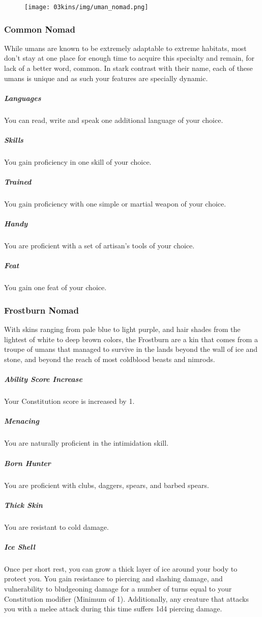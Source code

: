 \begin{linenumbers}
\begin{figure}[!t]
    \centering
    \texttt{[image: 03kins/img/uman\_nomad.png]}
\end{figure}

\subsubsection{Common Nomad}
While umans are known to be extremely adaptable to extreme habitats, most don't stay at one place for enough time to acquire this specialty and remain, for lack of a better word, common.
In stark contrast with their name, each of these umans is unique and as such your features are specially dynamic.
\subparagraph{Languages} You can read, write and speak one additional language of your choice.
\subparagraph{Skills} You gain proficiency in one skill of your choice.
\subparagraph{Trained} You gain proficiency with one simple or martial weapon of your choice.
\subparagraph{Handy} You are proficient with a set of artisan's tools of your choice.
\subparagraph{Feat} You gain one feat of your choice.

\subsubsection{Frostburn Nomad}
With skins ranging from pale blue to light purple, and hair shades from the lightest of white to deep brown colors, the Frostburn are a kin that comes from a troupe of umans that managed to survive in the lands beyond the wall of ice and stone, and beyond the reach of most coldblood beasts and nimrods.
\subparagraph{Ability Score Increase} Your Constitution score is increased by 1.
\subparagraph{Menacing} You are naturally proficient in the intimidation skill.
\subparagraph{Born Hunter} You are proficient with clubs, daggers, spears, and barbed spears.
\subparagraph{Thick Skin} %
You are resistant to cold damage.%
\subparagraph{Ice Shell} Once per short rest, you can grow a thick layer of ice around your body to protect you.
You gain resistance to piercing and slashing damage, and vulnerability to bludgeoning damage for a number of turns equal to your Constitution modifier (Minimum of 1).
Additionally, any creature that attacks you with a melee attack during this time suffers 1d4 piercing damage.


\end{linenumbers}
